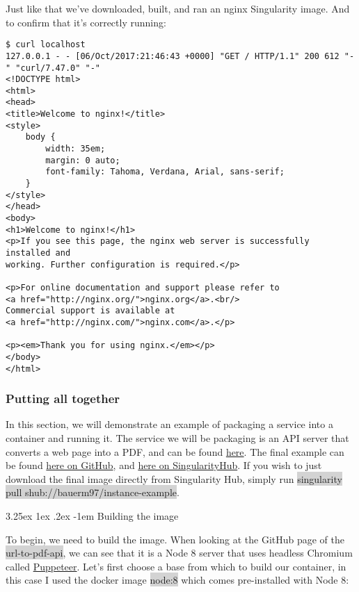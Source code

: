 \documentclass[a4paper]{article}
\makeatletter
\renewcommand\paragraph{\@startsection{paragraph}{5}{\z@}%
  {3.25ex \@plus1ex \@minus.2ex}%
  {-1em}%
  {\normalfont\normalsize\bfseries}}
\makeatother
\begin{document}
Just like that we’ve downloaded, built, and ran an nginx Singularity image. And to confirm that it’s correctly running:

\begin{lstlisting}[frame=single]  
$ curl localhost
127.0.0.1 - - [06/Oct/2017:21:46:43 +0000] "GET / HTTP/1.1" 200 612 "-" "curl/7.47.0" "-"
<!DOCTYPE html>
<html>
<head>
<title>Welcome to nginx!</title>
<style>
    body {
        width: 35em;
        margin: 0 auto;
        font-family: Tahoma, Verdana, Arial, sans-serif;
    }
</style>
</head>
<body>
<h1>Welcome to nginx!</h1>
<p>If you see this page, the nginx web server is successfully installed and
working. Further configuration is required.</p>

<p>For online documentation and support please refer to
<a href="http://nginx.org/">nginx.org</a>.<br/>
Commercial support is available at
<a href="http://nginx.com/">nginx.com</a>.</p>

<p><em>Thank you for using nginx.</em></p>
</body>
</html>

\end{lstlisting}

\subsubsection{Putting all together}

In this section, we will demonstrate an example of packaging a service into a container and running it. The service we will be packaging is an API server that converts a web page into a PDF, and can be found \href{https://github.com/alvarcarto/url-to-pdf-api}{here}. The final example can be found \href{https://github.com/bauerm97/instance-example}{here on GitHub}, and \href{https://singularity-hub.org/collections/bauerm97/instance-example/}{here on SingularityHub}. If you wish to just download the final image directly from Singularity Hub, simply run \colorbox{lightgray}{singularity pull shub://bauerm97/instance-example}.

	\paragraph{Building the image}

To begin, we need to build the image. When looking at the GitHub page of the \colorbox{lightgray}{url-to-pdf-api}, we can see that it is a Node 8 server that uses headless Chromium called \href{https://github.com/GoogleChrome/puppeteer}{Puppeteer}. Let’s first choose a base from which to build our container, in this case I used the docker image \colorbox{lightgray}{node:8} which comes pre-installed with Node 8:
\end{document}
